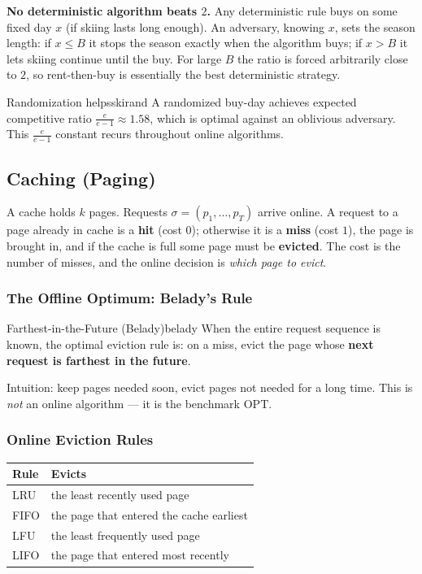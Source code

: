 \textbf{No deterministic algorithm beats $2$.} Any deterministic rule buys on some fixed day $x$ (if skiing lasts long enough). An adversary, knowing $x$, sets the season length: if $x \le B$ it stops the season exactly when the algorithm buys; if $x > B$ it lets skiing continue until the buy. For large $B$ the ratio is forced arbitrarily close to $2$, so rent-then-buy is essentially the best deterministic strategy.

\begin{remark}{Randomization helps}{skirand}
A randomized buy-day achieves expected competitive ratio $\frac{e}{e-1} \approx 1.58$, which is optimal against an oblivious adversary. This $\frac{e}{e-1}$ constant recurs throughout online algorithms.
\end{remark}

\subsection{Caching (Paging)}

A cache holds $k$ pages. Requests $\sigma = (p_1, \dots, p_T)$ arrive online. A request to a page already in cache is a \textbf{hit} (cost $0$); otherwise it is a \textbf{miss} (cost $1$), the page is brought in, and if the cache is full some page must be \textbf{evicted}. The cost is the number of misses, and the online decision is \emph{which page to evict}.

\subsubsection{The Offline Optimum: Belady's Rule}

\begin{theorem}{Farthest-in-the-Future (Belady)}{belady}
When the entire request sequence is known, the optimal eviction rule is: on a miss, evict the page whose \textbf{next request is farthest in the future}.
\end{theorem}

Intuition: keep pages needed soon, evict pages not needed for a long time. This is \emph{not} an online algorithm --- it is the benchmark $\mathrm{OPT}$.

\subsubsection{Online Eviction Rules}

\begin{center}
\begin{tabular}{ll}
\toprule
\textbf{Rule} & \textbf{Evicts} \\
\midrule
LRU  & the least recently used page \\
FIFO & the page that entered the cache earliest \\
LFU  & the least frequently used page \\
LIFO & the page that entered most recently \\
\bottomrule
\end{tabular}
\end{center}

